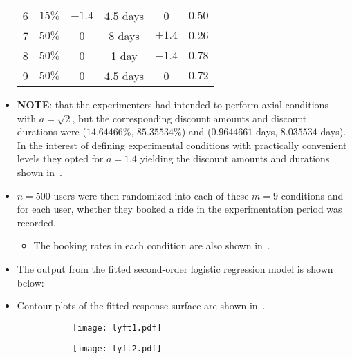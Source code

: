 \begin{itemize}
\begin{table}[!htbp]
\begin{tabular}{cccccc}
                  6                  & $15 \%$         & $-1.4$  & $4.5$ days        & 0       & $0.50$       \\
                  7                  & $50 \%$         & 0       & 8 days            & $+1.4$  & $0.26$       \\
                  8                  & $50 \%$         & 0       & 1 day             & $-1.4$  & $0.78$       \\
                  9                  & $50 \%$         & 0       & $4.5$ days        & 0       & $0.72$       \\
                  \bottomrule
              \end{tabular}
          \end{table}
    \item \textbf{NOTE}: that the experimenters had intended to perform axial conditions with $ a=\sqrt{2} $, but the
          corresponding discount amounts and discount durations were ($14.64466\%$, $85.35534\%$) and ($0.9644661$ days, $8.035534$ days). In the interest of defining experimental conditions with practically convenient
          levels they opted for $ a = 1.4 $ yielding the discount amounts and durations shown in~.
    \item $ n = 500 $ users were then randomized into each of these $ m = 9 $ conditions and for each user, whether
          they booked a ride in the experimentation period was recorded.
          \begin{itemize}
              \item The booking rates in each condition are also shown in~.
          \end{itemize}
    \item The output from the fitted second-order logistic regression model is shown below:
          
    \item Contour plots of the fitted response surface are shown in~.
          \begin{figure}[!htbp]
              \centering
              \begin{subfigure}{0.48\textwidth}
                  \centering
                  \texttt{[image: lyft1.pdf]}\caption{}\label{subfig:Lyft1}
              \end{subfigure}
              \begin{subfigure}{0.48\textwidth}
                  \centering
                  \texttt{[image: lyft2.pdf]}\caption{}\label{subfig:Lyft2}

\end{subfigure}
\end{figure}
\end{itemize}
